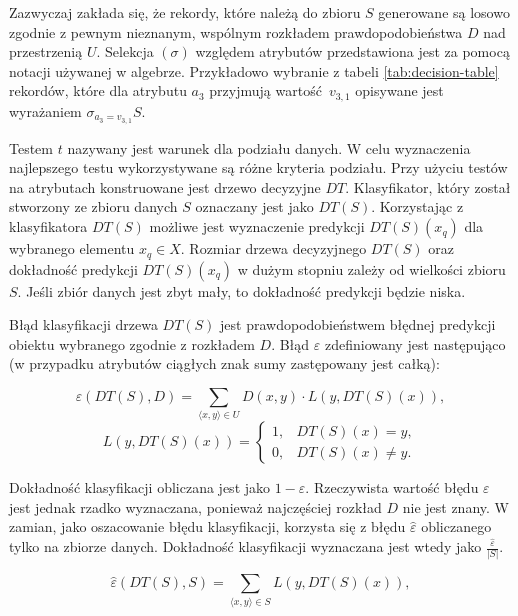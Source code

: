 \documentclass[12pt]{article}
\begin{document}
Zazwyczaj zakłada się, że rekordy, które należą do
zbioru $S$ generowane są losowo zgodnie z pewnym nieznanym, wspólnym rozkładem prawdopodobieństwa $D$ nad przestrzenią $U$.
Selekcja $(\sigma)$ względem atrybutów przedstawiona jest za pomocą notacji używanej w algebrze.
Przykładowo wybranie z tabeli \ref{tab:decision-table} rekordów, które dla atrybutu $a_3$ przyjmują
wartość~$v_{3,1}$ opisywane jest wyrażaniem $\sigma_{a_3=v_{3,1}}S$.

Testem $t$ nazywany jest warunek dla podziału danych. W celu wyznaczenia najlepszego testu wykorzystywane
są różne kryteria podziału. Przy użyciu testów na atrybutach konstruowane jest drzewo decyzyjne $DT$.
Klasyfikator, który został stworzony ze zbioru danych $S$ oznaczany jest jako $DT(S)$. Korzystając z klasyfikatora
$DT(S)$ możliwe jest wyznaczenie predykcji $DT(S)(x_q)$ dla wybranego elementu $x_q \in X$. Rozmiar drzewa decyzyjnego $DT(S)$ oraz dokładność predykcji $DT(S)(x_q)$
w dużym stopniu zależy od wielkości zbioru $S$. Jeśli zbiór danych jest zbyt mały, to dokładność predykcji będzie niska.

Błąd klasyfikacji drzewa $DT(S)$ jest prawdopodobieństwem błędnej predykcji obiektu wybranego zgodnie z rozkładem $D$.
Błąd $\varepsilon$ zdefiniowany jest następująco (w przypadku atrybutów ciągłych znak sumy zastępowany jest całką):

\begin{equation}
    \varepsilon(DT(S), D) = \displaystyle\sum_{\langle x, y\rangle \in U} D(x, y) \cdot L(y, DT(S)(x)),
\end{equation}
\begin{equation}
    L(y, DT(S)(x)) = \left\{
        \begin{array}{ll}
            1, & DT(S)(x) = y, \\
            0, & DT(S)(x) \neq y.
        \end{array} \right.
\end{equation}

\vspace{0.8cm}

Dokładność klasyfikacji obliczana jest jako $1 - \varepsilon$.
Rzeczywista wartość błędu $\varepsilon$ jest jednak rzadko wyznaczana, ponieważ najczęściej rozkład $D$ nie jest znany.
W zamian, jako oszacowanie błędu klasyfikacji, korzysta się z błędu $\hat{\varepsilon}$
obliczanego tylko na zbiorze danych. Dokładność klasyfikacji wyznaczana jest wtedy jako $\frac{\hat{\varepsilon}}{|S|}$.

\begin{equation}
    \hat{\varepsilon}(DT(S), S) = \displaystyle\sum_{\langle x, y\rangle \in S} L(y, DT(S)(x)),
\end{equation}
\end{document}
